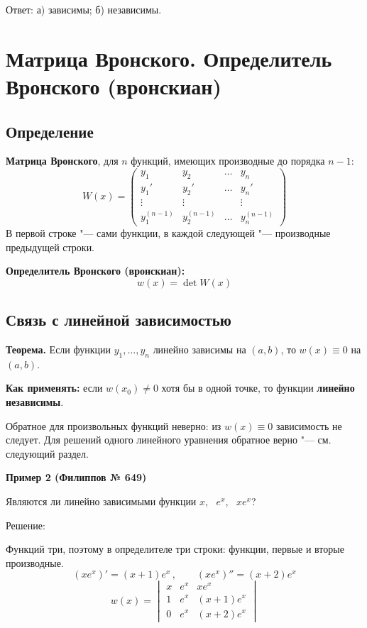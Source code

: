 \documentclass[11pt,a4paper]{article}
\newcommand{\example}[1]{\par\medskip\noindent\textbf{#1}\par\nopagebreak\smallskip}
\begin{document}
Ответ: а) зависимы; б) независимы.

\section*{Матрица Вронского. Определитель Вронского (вронскиан)}

\subsection*{Определение}

\textbf{Матрица Вронского}, для $n$ функций, имеющих производные до порядка $n - 1$:
\[
  W(x) =
  \begin{pmatrix}
    y_1 & y_2 & \dots & y_n \\
    y_1' & y_2' & \dots & y_n' \\
    \vdots & \vdots & & \vdots \\
    y_1^{(n-1)} & y_2^{(n-1)} & \dots & y_n^{(n-1)}
  \end{pmatrix}
\]
В первой строке "--- сами функции, в каждой следующей "--- производные предыдущей строки.

\textbf{Определитель Вронского (вронскиан):}
\[
  w(x) = \det W(x)
\]


\subsection*{Связь с линейной зависимостью}

\textbf{Теорема.} Если функции $y_1, \dots, y_n$ линейно зависимы на $(a, b)$, то $w(x) \equiv 0$ на $(a, b)$.

\textbf{Как применять:} если $w(x_0) \ne 0$ хотя бы в одной точке, то функции \textbf{линейно независимы}.

Обратное для произвольных функций неверно: из $w(x) \equiv 0$ зависимость не следует. Для решений одного линейного уравнения обратное верно "--- см. следующий раздел.

\example{Пример 2 (Филиппов № 649)}

Являются ли линейно зависимыми функции $x$, \ $e^{x}$, \ $x e^{x}$?

Решение:

Функций три, поэтому в определителе три строки: функции, первые и вторые производные.
\[
  (x e^{x})' = (x + 1)e^{x}\,, \qquad (x e^{x})'' = (x + 2)e^{x}
\]
\[
  w(x) =
  \begin{vmatrix}
    x & e^{x} & x e^{x} \\
    1 & e^{x} & (x + 1)e^{x} \\
    0 & e^{x} & (x + 2)e^{x}
  \end{vmatrix}
\]
\end{document}
